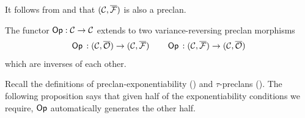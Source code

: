 It follows from 
 and 
that $(\mathcal{C},{\overline{{\mathcal{F}}}})$ is also a preclan.

\begin{proposition}\label{prop:op-preclan-morphism}
  The functor $\mathop{\mathsf{Op}} : \mathcal{C} \to \mathcal{C}$
  extends to two variance-reversing preclan morphisms
  \[ \mathop{\mathsf{Op}}{} : (\mathcal{C}, {\overline{{\mathcal{O}}}}) \to (\mathcal{C}, {\overline{{\mathcal{F}}}})
  \quad \quad
  \mathop{\mathsf{Op}}{} : (\mathcal{C}, {\overline{{\mathcal{F}}}}) \to (\mathcal{C}, {\overline{{\mathcal{O}}}}) \]
  which are inverses of each other.
\end{proposition}

Recall the definitions of preclan-exponentiability
()
and $\tau$-preclans ().
The following proposition says that given half of the exponentiability conditions we require,
$\mathop{\mathsf{Op}}$ automatically generates the other half.

